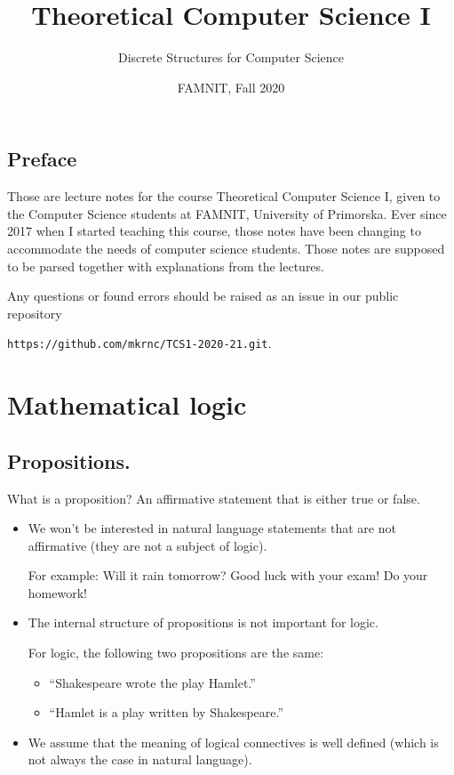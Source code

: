 \documentclass[11pt,paper=b5,footinclude,headinclude]{scrbook} %
\theoremstyle{remark}
\theoremstyle{definition} %
\begin{document}
\title{Theoretical Computer Science I}

\date{FAMNIT, Fall 2020}
\author{Discrete Structures for Computer Science\\}
\maketitle

\section*{Preface}

Those are lecture notes for the course Theoretical Computer Science I, given to the Computer Science students at FAMNIT, University of Primorska.
Ever since 2017 when I started teaching this course, those notes have been changing to accommodate the needs of computer science students.
Those notes are supposed to be parsed together with explanations from the lectures. 

Any questions or found errors should be 
raised as an issue in our public repository 
\begin{center}
    \texttt{https://github.com/mkrnc/TCS1-2020-21.git}.    
\end{center}

\tableofcontents

\chapter{Mathematical logic}
\section*{Propositions.}

What is a proposition? An affirmative statement that is either true or false.
\begin{itemize}
  \item We won't be interested in natural language statements that are not affirmative (they are not a subject of logic).
  

  For example: Will it rain tomorrow? Good luck with your exam! Do your homework!

  \item The internal structure of propositions is not important for logic.

  For logic, the following two propositions are the same:
  \begin{itemize}
    \item ``Shakespeare wrote the play Hamlet.''

    \item ``Hamlet is a play written by Shakespeare.''
  \end{itemize}
  \item We assume that the meaning of logical connectives is well defined (which is not always the case in natural language).
\end{itemize}
\end{document}
